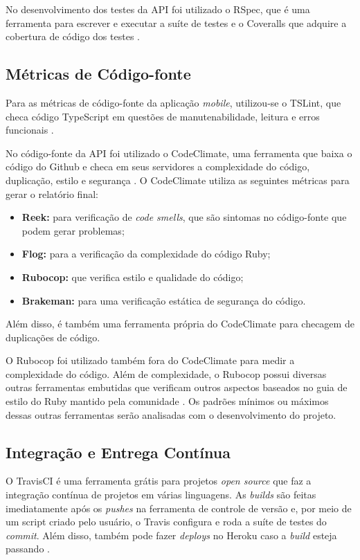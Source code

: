 No desenvolvimento dos testes da API foi utilizado o RSpec, que é uma ferramenta para escrever e executar a suíte de testes \cite{rspec} e o Coveralls que adquire a cobertura de código dos testes \cite{coveralls}.

\subsection{Métricas de Código-fonte}
Para as métricas de código-fonte da aplicação \textit{mobile}, utilizou-se o TSLint, que checa código TypeScript em questões de manutenabilidade, leitura e erros funcionais \cite{tslint}.

No código-fonte da API foi utilizado o CodeClimate, uma ferramenta que baixa o código do Github e checa em seus servidores a complexidade do código, duplicação, estilo e segurança \cite{codeclimate}. O CodeClimate utiliza as seguintes métricas para gerar o relatório final:
\begin{itemize}
    \item \textbf{Reek:} para verificação de \textit{code smells}, que são sintomas no código-fonte que podem gerar problemas;
    \item \textbf{Flog:} para a verificação da complexidade do código Ruby;
    \item \textbf{Rubocop:} que verifica estilo e qualidade do código;
    \item \textbf{Brakeman:} para uma verificação estática de segurança do código.
\end{itemize}

Além disso, é também uma ferramenta própria do CodeClimate para checagem de duplicações de código.

O Rubocop foi utilizado também fora do CodeClimate para medir a complexidade do código. Além de complexidade, o Rubocop possui diversas outras ferramentas embutidas que verificam outros aspectos baseados no guia de estilo do Ruby mantido pela comunidade \cite{rubocop}. Os padrões mínimos ou máximos dessas outras ferramentas serão analisadas com o desenvolvimento do projeto.

\subsection{Integração e Entrega Contínua}

O TravisCI é uma ferramenta grátis para projetos \textit{open source} que faz a integração contínua de projetos em várias linguagens. As \textit{builds} são feitas imediatamente após os \textit{pushes} na ferramenta de controle de versão e, por meio de um script criado pelo usuário, o Travis configura e roda a suíte de testes do \textit{commit}. Além disso, também pode fazer \textit{deploys} no Heroku caso a \textit{build} esteja passando \cite{travis-ci}.

